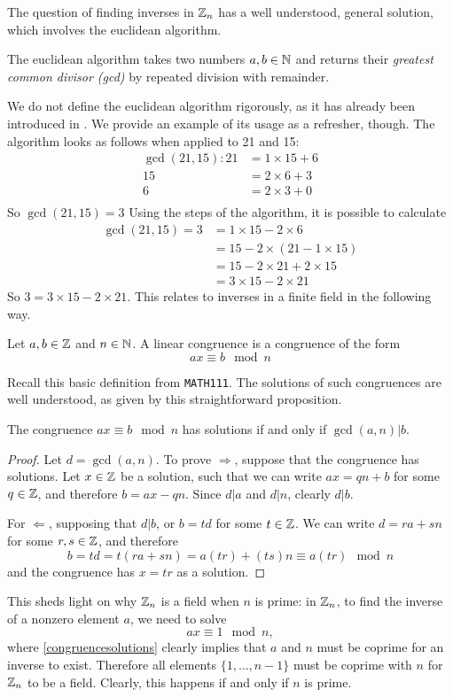 The question of finding inverses in $\mathbb{Z}_{n}$ has a well understood, general solution, which involves the euclidean algorithm.
\begin{definition}
	The euclidean algorithm takes two numbers $a,b \in \mathbb{N}$ and returns their \emph{greatest common divisor (gcd)} by repeated division with remainder.
\end{definition}
We do not define the euclidean algorithm rigorously, as it has already been introduced in \cite{111-lectures}.
We provide an example of its usage as a refresher, though.
The algorithm looks as follows when applied to 21 and 15:
\begin{align*}
	\gcd(21,15):21 &= 1\times15 + 6\\
	15 &= 2\times6 + 3\\
	6 &= 2\times3 + 0\\
\end{align*}
So $\gcd(21,15)=3$
Using the steps of the algorithm, it is possible to calculate
\begin{align*}
	\gcd(21,15) = 3 &= 1\times15 - 2\times6\\
	&= 15 - 2\times(21 - 1\times15)\\
	&= 15 - 2\times21 + 2\times15\\
	&=3\times15 - 2\times21
\end{align*}
So $3 = 3\times15 - 2\times21$.
This relates to inverses in a finite field in the following way.
\begin{definition}
	Let $a,b \in \mathbb{Z}$ and $n \in \mathbb{N}$.
	A linear congruence is a congruence of the form
	$$ax \equiv b \mod n$$
\end{definition}
Recall this basic definition from \texttt{MATH111}.
The solutions of such congruences are well understood, as given by this straightforward proposition.
\begin{proposition}
	The congruence $ax \equiv b \mod n$ has solutions if and only if $\gcd(a,n)|b$.\label{congruencesolutions}
\end{proposition}
\begin{proof}
	Let $d = \gcd(a,n)$.
	To prove $\Rightarrow$, suppose that the congruence has solutions.
	Let $x \in \mathbb{Z}$ be a solution, such that we can write $ax = qn + b$ for some $q \in \mathbb{Z}$, and therefore $b = ax - qn$.
	Since $d|a$ and $d|n$, clearly $d|b$.

	For  $\Leftarrow$, supposing that $d|b$, or $b=td$ for some $t \in \mathbb{Z}$.
	We can write $d = ra + sn$ for some $r,s \in \mathbb{Z}$, and therefore
	$$b = td = t(ra + sn) = a(tr) + (ts)n \equiv a(tr) \mod n$$
	and the congruence has $x = tr$ as a solution.
\end{proof}
This sheds light on why $\mathbb{Z}_{n}$ is a field when $n$ is prime: in $\mathbb{Z}_{n}$, to find the inverse of a nonzero element $a$, we need to solve
$$ax \equiv 1 \mod n,$$
where \cref{congruencesolutions} clearly implies that $a$ and $n$ must be coprime for an inverse to exist.
Therefore all elements $\{1,\ldots,n-1\}$ must be coprime with $n$ for $\mathbb{Z}_{n}$ to be a field.
Clearly, this happens if and only if $n$ is prime.

